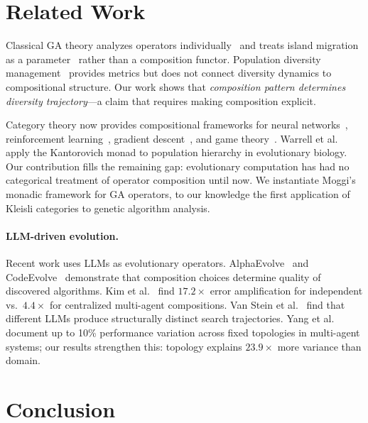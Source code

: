 \documentclass[dvipsnames,format=sigconf,anonymous=false,review=false]{acmart}
\begin{document}
\section{Related Work}

Classical GA theory analyzes operators individually~\cite{holland1975adaptation, goldberg1989genetic, mitchell1992royal} and treats island migration as a parameter~\cite{whitley1999island, skolicki2005influence} rather than a composition functor. Population diversity management~\cite{burke2004diversity, crepinsek2013exploration} provides metrics but does not connect diversity dynamics to compositional structure. Our work shows that \emph{composition pattern determines diversity trajectory}---a claim that requires making composition explicit.

Category theory now provides compositional frameworks for neural networks~\cite{gavranovic2024categorical}, reinforcement learning~\cite{bakirtzis2024compositional, hedges2024reinforcement}, gradient descent~\cite{hanks2024gradient}, and game theory~\cite{ghani2025approximate}. Warrell et al.~\cite{warrell2024kantorovich} apply the Kantorovich monad to population hierarchy in evolutionary biology. Our contribution fills the remaining gap: evolutionary computation has had no categorical treatment of operator composition until now. We instantiate Moggi's~\cite{moggi1991notions} monadic framework for GA operators, to our knowledge the first application of Kleisli categories to genetic algorithm analysis.

\paragraph{LLM-driven evolution.}
Recent work uses LLMs as evolutionary operators. AlphaEvolve~\cite{alphaevolve2026marl} and CodeEvolve~\cite{assumpcao2025codeevolve} demonstrate that composition choices determine quality of discovered algorithms. Kim et al.~\cite{kim2025scaling} find $17.2\times$ error amplification for independent vs.\ $4.4\times$ for centralized multi-agent compositions. Van Stein et al.~\cite{vanstein2025code} find that different LLMs produce structurally distinct search trajectories. Yang et al.~\cite{yang2025topology} document up to 10\% performance variation across fixed topologies in multi-agent systems; our results strengthen this: topology explains $23.9\times$ more variance than domain.

\section{Conclusion}
\end{document}
